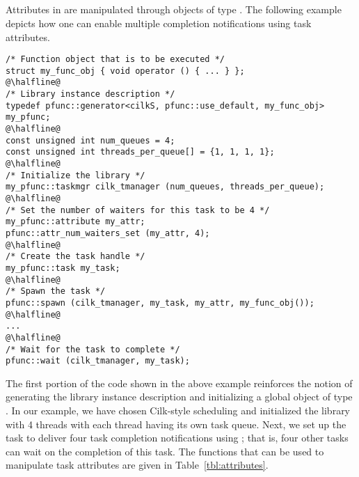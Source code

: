 \subsection{\Cpp{}}
Attributes in \Cpp{} are manipulated through objects of type .
The following example depicts how one can enable multiple completion
notifications using task attributes.
%
\begin{lstlisting}
/* Function object that is to be executed */
struct my_func_obj { void operator () { ... } };
@\halfline@
/* Library instance description */
typedef pfunc::generator<cilkS, pfunc::use_default, my_func_obj> my_pfunc;
@\halfline@
const unsigned int num_queues = 4; 
const unsigned int threads_per_queue[] = {1, 1, 1, 1}; 
@\halfline@
/* Initialize the library */
my_pfunc::taskmgr cilk_tmanager (num_queues, threads_per_queue);
@\halfline@
/* Set the number of waiters for this task to be 4 */
my_pfunc::attribute my_attr;
pfunc::attr_num_waiters_set (my_attr, 4);
@\halfline@
/* Create the task handle */
my_pfunc::task my_task;
@\halfline@
/* Spawn the task */
pfunc::spawn (cilk_tmanager, my_task, my_attr, my_func_obj());
@\halfline@
...
@\halfline@
/* Wait for the task to complete */
pfunc::wait (cilk_tmanager, my_task);
\end{lstlisting}
%
The first portion of the code shown in the above example reinforces the notion
of generating the library instance description and initializing a global object
of type . 
%
In our example, we have chosen Cilk-style scheduling and initialized the
library with 4 threads with each thread having its own task queue. 
%
Next, we set up the task to deliver four task completion notifications using
; that is, four other tasks can wait on the
completion of this task. 
%
The functions that can be used to manipulate task attributes are given in 
Table~\ref{tbl:attributes}.
%

